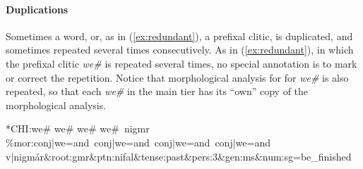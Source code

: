 \paragraph{Duplications}
Sometimes a word, or, as in (\ref{ex:redundant}), a prefixal clitic, 
is duplicated, and sometimes repeated
several times consecutively. As in (\ref{ex:redundant}), in which the prefixal clitic \textit{we\#} is 
repeated several times, no special annotation is to mark or correct the repetition. Notice that morphological analysis for
for \textit{we\#} is also repeated, so that each \textit{we\#} in the main tier has its ``own'' copy of the morphological analysis.
\begin{exe} \label{ex:redundant}
\ex \textsf{*CHI:\quad we\# we\# we\# we\#\, nigmr } \\
   \textsf{\%mor:\quad conj|we=and\, conj|we=and\, conj|we=and\, conj|we=and} \\
   \textsf{v|nigm\'ar\&root:gmr\&ptn:nifal\&tense:past\&pers:3\&gen:ms\&num:sg=be\_finished }
\end{exe}

 

